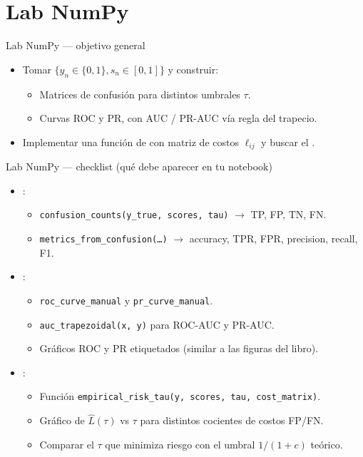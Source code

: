 \section[Lab NumPy]{Lab NumPy\label{sec:labnumpy}}

\begin{frame}{Lab NumPy — objetivo general}
\begin{itemize}
  \item Tomar \(\{y_n\in\{0,1\}, s_n\in[0,1]\}\) y construir:
  \begin{itemize}
    \item Matrices de confusión para distintos umbrales \(\tau\).
    \item Curvas ROC y PR, con AUC / PR-AUC vía regla del trapecio.
  \end{itemize}
  \item Implementar una función de  con matriz de costos \(\ell_{ij}\) y buscar el .
\end{itemize}
\end{frame}

\begin{frame}{Lab NumPy — checklist (qué debe aparecer en tu notebook)}
\small
\begin{itemize}
  \item {}:
  \begin{itemize}
    \item \texttt{confusion\_counts(y\_true, scores, tau)} \(\rightarrow\) TP, FP, TN, FN.
    \item \texttt{metrics\_from\_confusion(\dots)} \(\rightarrow\) accuracy, TPR, FPR, precision, recall, F1.
  \end{itemize}
  \item {}:
  \begin{itemize}
    \item \texttt{roc\_curve\_manual} y \texttt{pr\_curve\_manual}.
    \item \texttt{auc\_trapezoidal(x, y)} para ROC-AUC y PR-AUC.
    \item Gráficos ROC y PR etiquetados (similar a las figuras del libro).
  \end{itemize}
  \item {}:
  \begin{itemize}
    \item Función \texttt{empirical\_risk\_tau(y, scores, tau, cost\_matrix)}.
    \item Gráfico de \(\hat{L}(\tau)\) vs \(\tau\) para distintos cocientes de costos FP/FN.
    \item Comparar el \(\tau\) que minimiza riesgo con el umbral \(1/(1+c)\) teórico.
  \end{itemize}
\end{itemize}
\end{frame}

